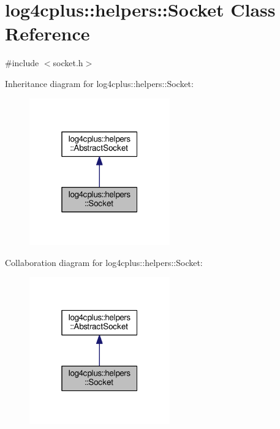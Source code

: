 \hypertarget{classlog4cplus_1_1helpers_1_1Socket}{\section{log4cplus\-:\-:helpers\-:\-:Socket Class Reference}
\label{classlog4cplus_1_1helpers_1_1Socket}
}


{\ttfamily \#include $<$socket.\-h$>$}



Inheritance diagram for log4cplus\-:\-:helpers\-:\-:Socket\-:
\nopagebreak
\begin{figure}[H]
\begin{center}
\leavevmode
\includegraphics[width=172pt]{classlog4cplus_1_1helpers_1_1Socket__inherit__graph}
\end{center}
\end{figure}


Collaboration diagram for log4cplus\-:\-:helpers\-:\-:Socket\-:
\nopagebreak
\begin{figure}[H]
\begin{center}
\leavevmode
\includegraphics[width=172pt]{classlog4cplus_1_1helpers_1_1Socket__coll__graph}
\end{center}
\end{figure}
